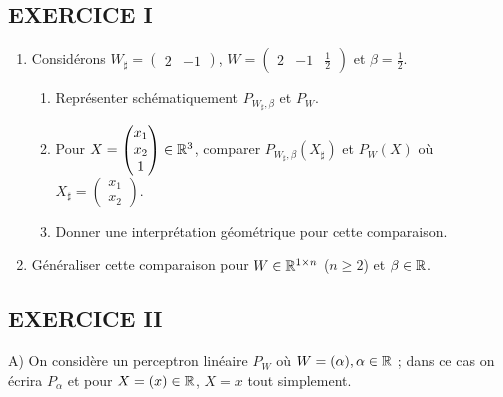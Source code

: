 \documentclass{my_class}%
\begin{document}
\subsection*{ EXERCICE I}
\begin{enumerate}
\item Considérons $W_\sharp =\begin{pmatrix} 2 & -1   \end{pmatrix}$, $W =\begin{pmatrix} 2 & -1 & \frac{1}{2} \end{pmatrix}$ et $\beta=\frac{1}{2}$. 
\begin{enumerate}
\item   Représenter schématiquement $P_{W_\sharp,\beta}$ et $P_W$.
\item Pour $X=\begin{pmatrix}x_1\\ x_2\\ 1 \end{pmatrix}\in\mathbb{R} ^3$, 
comparer $P_{W_\sharp,\beta}(X_\sharp)$ et $P_W(X)$ où $X_\sharp=\begin{pmatrix}x_1\\ x_2 \end{pmatrix}$.
\item Donner une interprétation géométrique pour cette comparaison.
\end{enumerate}
\item Généraliser cette comparaison pour $W\in \mathbb{R} ^{1\times n}$ ($n\geq 2$) et $\beta\in  \mathbb{R} $.
\end{enumerate}



\subsection*{EXERCICE II}
A) On considère un perceptron linéaire $P_W$  où $W=(\alpha), \alpha\in\mathbb{R} $ ; dans ce cas on écrira $P_\alpha$ et pour $X=(x)\in\mathbb{R} $, $X=x$ tout simplement.
\begin{center}

\end{center}
\end{document}
